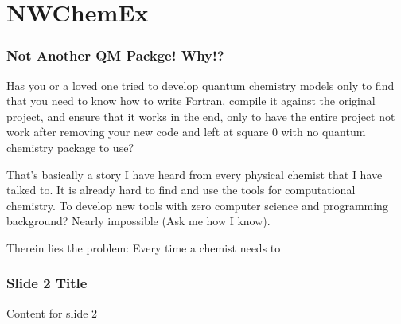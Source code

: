 \section{NWChemEx}

\begin{frame}
\sectionpage
\end{frame}

\begin{frame}
\frametitle{Not Another QM Packge! Why!?}
Has you or a loved one tried to develop quantum chemistry models only to find that you need to know how to write Fortran, compile it against the original project, and ensure that it works in the end, only to have the entire
project not work after removing your new code and left at square 0 with no quantum chemistry package to use?

That's basically a story I have heard from every physical chemist that I have talked to. It is already hard to find and use the tools for computational chemistry. To develop new tools with zero computer science and programming background?
Nearly impossible (Ask me how I know).
\end{frame}

\begin{frame}
Therein lies the problem: Every time a chemist needs to 
\end{frame}


\begin{frame}
\frametitle{Slide 2 Title}
Content for slide 2
\end{frame}
